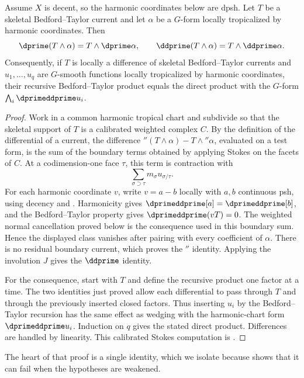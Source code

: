 \begin{theorem}
\label{thm:bt-harmonic-compatibility}
Assume $X$ is decent, so the harmonic coordinates below are dpsh.
Let $T$ be a skeletal Bedford--Taylor current and let $\alpha$ be a $G$-form
locally tropicalized by harmonic coordinates.  Then
\[
 \dprime(T\wedge\alpha)=T\wedge\dprime\alpha,
 \qquad
 \ddprime(T\wedge\alpha)=T\wedge\ddprime\alpha.
\]
Consequently, if $T$ is locally a difference of skeletal Bedford--Taylor
currents and $u_1,\ldots,u_q$ are $G$-smooth functions locally tropicalized
by harmonic coordinates, their recursive Bedford--Taylor product equals the
direct product with the $G$-form
$\bigwedge_i\dprimeddprime u_i$.
\end{theorem}
\begin{proof}
Work in a common harmonic tropical chart and subdivide so that the skeletal
support of $T$ is a calibrated weighted complex $C$.  By the definition of
the differential of a current, the difference
$\dprime(T\wedge\alpha)-T\wedge\dprime\alpha$, evaluated on a test form, is
the sum of the boundary terms obtained by applying Stokes on the facets of
$C$.  At a codimension-one face $\tau$, this term is contraction with
\[
             \sum_{\sigma\supset\tau}
                    m_\sigma u_{\sigma/\tau}.
\]
For each harmonic coordinate $v$, write $v=a-b$ locally with $a,b$
continuous psh, using decency and .
Harmonicity gives $\dprimeddprime[a]=\dprimeddprime[b]$, and the
Bedford--Taylor property gives $\dprimeddprime(vT)=0$.
The weighted normal cancellation proved below is the consequence used
in this boundary sum.  Hence the displayed class vanishes after
pairing with every coefficient of $\alpha$.  There is no residual boundary
current, which proves the $\dprime$ identity.  Applying the involution $J$
gives the $\ddprime$ identity.

For the consequence, start with $T$ and define the recursive product one
factor at a time.  The two identities just proved allow each differential
to pass through $T$ and through the previously inserted closed factors.
Thus inserting $u_i$ by the Bedford--Taylor recursion has the same effect as
wedging with the harmonic-chart form $\dprimeddprime u_i$.  Induction on $q$
gives the stated direct product.  Differences are handled by linearity.
This calibrated Stokes computation is
\cite[Proposition~8.11.1 and Corollary~8.11.2]{CLD25}.
\end{proof}

The heart of that proof is a single identity, which we isolate because
 shows that it can fail when the
hypotheses are weakened.

